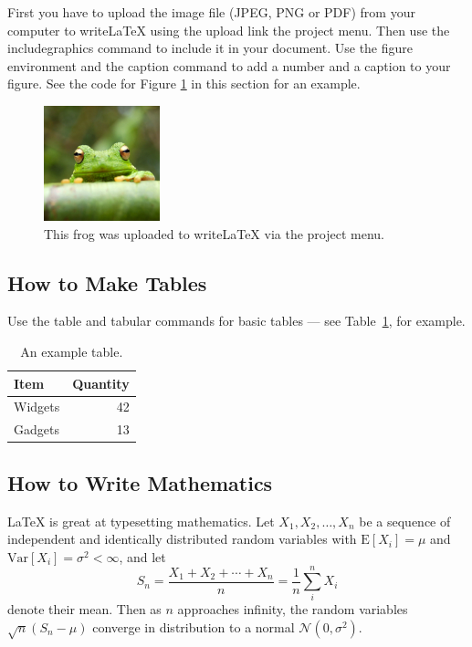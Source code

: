 \documentclass[a4paper]{article}
\begin{document}
First you have to upload the image file (JPEG, PNG or PDF) from your computer to writeLaTeX using the upload link the project menu. Then use the includegraphics command to include it in your document. Use the figure environment and the caption command to add a number and a caption to your figure. See the code for Figure \ref{fig:frog} in this section for an example.

\begin{figure}
\centering
\includegraphics[width=0.3\textwidth]{frog.jpg}
\caption{\label{fig:frog}This frog was uploaded to writeLaTeX via the project menu.}
\end{figure}

\subsection{How to Make Tables}

Use the table and tabular commands for basic tables --- see Table~\ref{tab:widgets}, for example.

\begin{table}
\centering
\begin{tabular}{l|r}
Item & Quantity \\\hline
Widgets & 42 \\
Gadgets & 13
\end{tabular}
\caption{\label{tab:widgets}An example table.}
\end{table}

\subsection{How to Write Mathematics}

\LaTeX{} is great at typesetting mathematics. Let $X_1, X_2, \ldots, X_n$ be a sequence of independent and identically distributed random variables with $\text{E}[X_i] = \mu$ and $\text{Var}[X_i] = \sigma^2 < \infty$, and let
$$S_n = \frac{X_1 + X_2 + \cdots + X_n}{n}
      = \frac{1}{n}\sum_{i}^{n} X_i$$
denote their mean. Then as $n$ approaches infinity, the random variables $\sqrt{n}(S_n - \mu)$ converge in distribution to a normal $\mathcal{N}(0, \sigma^2)$.
\end{document}

